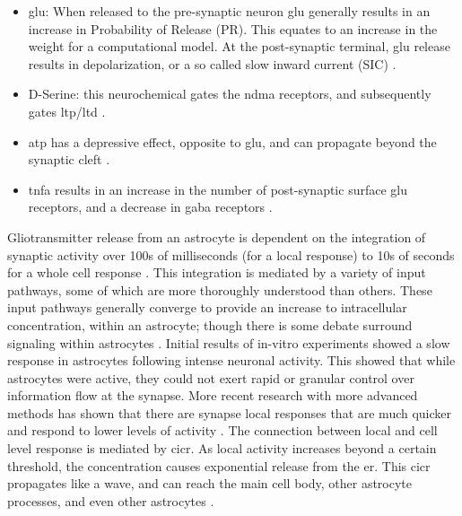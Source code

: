     \begin{itemize}
      \item \Gls{glu}: When released to the pre-synaptic neuron \gls{glu} generally
        results in an increase in Probability of Release (PR). This equates to
        an increase in the weight for a computational model. At the
        post-synaptic terminal, \gls{glu} release results in depolarization, or
        a so called slow inward current (SIC) \parencite{pitta_2016}.
      \item D-Serine: this neurochemical gates the \gls{ndma} receptors, and
        subsequently gates \gls{ltp}/\gls{ltd} \parencite{mederos_2018}.
      \item \Gls{atp} has a depressive effect, opposite to \gls{glu}, and can
        propagate beyond the synaptic cleft \parencite{mederos_2018}.
      \item \Gls{tnfa} results in an increase in the number of post-synaptic
        surface \gls{glu} receptors, and a decrease in \gls{gaba} receptors
        \parencite{chung_2015}.
    \end{itemize}

    Gliotransmitter release from an astrocyte is dependent on the integration of
    synaptic activity over 100s of milliseconds (for a local response)
    \parencite{pitta_2016} to 10s of seconds for a whole cell response
    \parencite{mederos_2018}. This integration is mediated by a variety of input
    pathways, some of which are more thoroughly understood than others. These
    input pathways generally converge to provide an increase to intracellular
    \ca concentration, within an astrocyte; though there is some debate surround
    \ca signaling within astrocytes \parencite{mederos_2018}. Initial results of
    in-vitro experiments showed a slow \ca response in astrocytes following
    intense neuronal activity. This showed that while astrocytes were active,
    they could not exert rapid or granular control over information flow at the
    synapse. More recent research with more advanced methods has shown that
    there are synapse local \ca responses that are much quicker and respond to
    lower levels of activity \parencite{araque_2014}. The connection between local
    and cell level response is mediated by \gls{cicr}. As local activity
    increases beyond a certain threshold, the \ca concentration causes
    exponential \ca release from the \gls{er}. This \gls{cicr} propagates like a
    wave, and can reach the main cell body, other astrocyte processes, and even
    other astrocytes \parencite{manninen_2018}.

